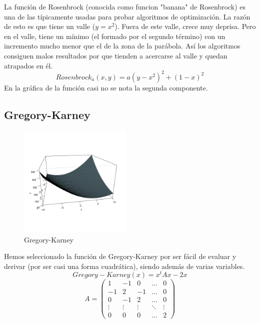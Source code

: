 \documentclass[10pt]{article}
\theoremstyle{definition}
\begin{document}
La función de Rosenbrock (conocida como funcion "banana" de
Rosenbrock) es una de las típicamente usadas para probar algoritmos de
optimización. La razón de esto es que tiene un valle ($y=x^2$). Fuera
de este valle, crece muy deprisa. Pero en el valle, tiene un mínimo
(el formado por el segundo término) con un incremento mucho menor que
el de la zona de la parábola. Así los algoritmos consiguen malos
resultados por que tienden a acercarse al valle y quedan atrapados en él.
\begin{displaymath}
Rosenbrock_a(x,y)=a(y-x^2)^2+(1-x)^2
\end{displaymath}
En la gráfica de la función casi no se nota la segunda componente.

\subsection{Gregory-Karney} \label{sub:fun-gregory-karney}

\begin{figure}
  \vspace{-70pt}
  \begin{center}
    \includegraphics[width=0.48\textwidth]{../theoretic_study/func_gregory-carney/gregory.pdf}
  \end{center}
  \vspace{-60pt}
  \caption{Gregory-Karney}
  \vspace{-40pt}
\end{figure}

Hemos seleccionado la función de Gregory-Karney por ser fácil de evaluar y 
derivar (por ser casi una forma cuadrática), siendo además de varias variables.
\begin{displaymath}
	Gregory-Karney(x)=x^tAx-2x 
\end{displaymath}
\begin{displaymath}
	A=\left(\begin{array}{ccccc}
			1 & -1 & 0 & \dots & 0 \\
			-1 & 2 & -1 & \dots & 0 \\
			0 & -1 & 2 & \dots & 0 \\
			\vdots & \vdots & \vdots & \ddots & \vdots \\
			0 & 0 & 0 & \dots & 2
			\end{array}\right)
\end{displaymath}
\end{document}
